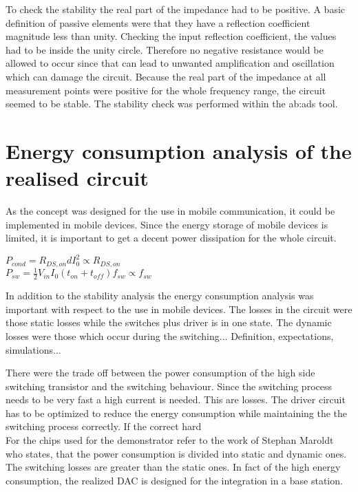 To check the stability the real part of the impedance had to be positive.
A basic definition of passive elements were that they have a reflection coefficient magnitude less than unity.
Checking the input reflection coefficient, the values had to be inside the unity circle.
Therefore no negative resistance would be allowed to occur since that can lead to unwanted amplification and oscillation which can damage the circuit.
Because the real part of the impedance at all measurement points were positive for the whole frequency range, the circuit seemed to be stable.
The stability check was performed within the \gls{ab:ads} tool. 


\section{Energy consumption analysis of the realised circuit}
As the concept was designed for the use in mobile communication, it could be implemented in mobile devices.
Since the energy storage of mobile devices is limited, it is important to get a decent power dissipation for the whole circuit.

$ P_{cond} = R_{DS,on}dI_0^2 \propto R_{DS,on} $ \\
$ P_{sw} = \frac{1}{2} V_{in}I_0(t_{on}+t_{off})f_{sw} \propto f_{sw} $ 

In addition to the stability analysis the energy consumption analysis was important with respect to the use in mobile devices.
The losses in the circuit were those static losses while the switches plus driver is in one state.
The dynamic losses were those which occur during the switching...
Definition, expectations, simulations...

There were the trade off between the power consumption of the high side switching transistor and the switching behaviour.
Since the switching process needs to be very fast a high current is needed.
This are losses.
The driver circuit has to be optimized to reduce the energy consumption while maintaining the the switching process correctly.
If the correct hard 
\\
 For the chips used for the demonstrator refer to the work of Stephan Maroldt who states, that the power consumption is divided into static and dynamic ones. The switching losses are greater than the static ones.
In fact of the high energy consumption, the realized DAC is designed for the integration in a base station.

